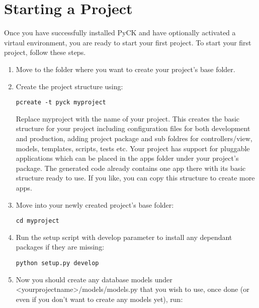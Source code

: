 \documentclass[letterpaper,10pt,english]{sphinxmanual}
\begin{document}
\chapter{Starting a Project}
\label{start-project:starting-a-project}\label{start-project::doc}\label{start-project:start-project}
Once you have successfully installed PyCK and have optionally activated a virtaul environment, you are ready to start your first project. To start your first project, follow these steps.
\begin{enumerate}
\item {} 
Move to the folder where you want to create your project's base folder.

\item {} 
Create the project structure using:

\begin{Verbatim}[commandchars=\\\{\}]
pcreate -t pyck myproject
\end{Verbatim}

Replace myproject with the name of your project. This creates the basic structure for your project including configuration files for both development and production, adding project package and sub foldres for controllers/view, models, templates, scripts, tests etc. Your project has support for pluggable applications which can be placed in the apps folder under your project's package. The generated code already contains one app there with its basic structure ready to use. If you like, you can copy this structure to create more apps.

\item {} 
Move into your newly created project's base folder:

\begin{Verbatim}[commandchars=\\\{\}]
cd myproject
\end{Verbatim}

\item {} 
Run the setup script with develop parameter to install any dependant packages if they are missing:

\begin{Verbatim}[commandchars=\\\{\}]
python setup.py develop
\end{Verbatim}

\item {} 
Now you should create any database models under \textless{}yourprojectname\textgreater{}/models/models.py that you wish to use, once done (or even if you don't want to create any models yet), run:


\end{enumerate}
\end{document}
